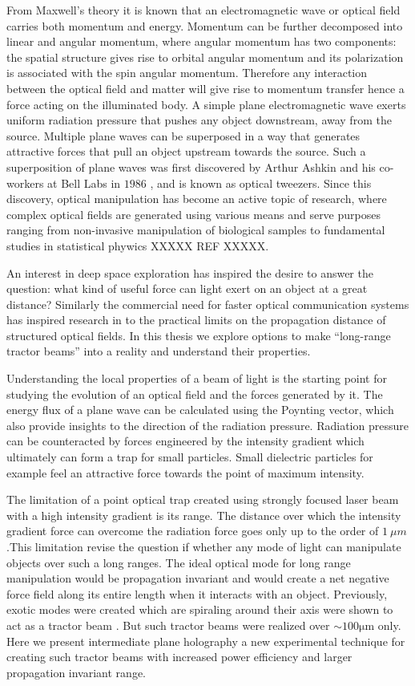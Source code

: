 From Maxwell's theory it is known that an electromagnetic wave or optical field carries both momentum and energy. Momentum can be further decomposed into linear and angular momentum, where angular momentum has two components: the spatial structure gives rise to orbital angular momentum \cite{Yao2011} and its polarization is associated with the spin angular momentum. Therefore any interaction between the optical field and matter will give rise to momentum transfer hence a force acting on the illuminated body. A simple plane electromagnetic wave exerts uniform radiation pressure that pushes any object downstream, away from the source. Multiple plane waves can be superposed in a way that generates attractive forces that pull an object upstream towards the source. Such a superposition of plane waves was first discovered by Arthur Ashkin and his co-workers at Bell Labs in $1986$ \cite{beth1936}, and is known as optical tweezers. Since this discovery, optical manipulation has become an active topic of research, where complex optical fields are generated using various means and serve purposes ranging from non-invasive manipulation of biological samples to fundamental studies in statistical phywics XXXXX REF XXXXX.


An interest in deep space exploration has inspired the desire to answer the question: what kind of useful force can light exert on an object at a great distance? Similarly the commercial need for faster optical communication systems has inspired research in to the practical limits on the propagation distance of structured optical fields. In this thesis we explore options to make ``long-range tractor beams'' into a reality and understand their properties.


Understanding the local properties of a beam of light is the starting point for studying the evolution of an optical field and the forces generated by it. The energy flux of a plane wave can be calculated using the Poynting vector, which also provide insights to the direction of the radiation pressure. Radiation pressure can be counteracted by forces engineered by the intensity gradient which ultimately can form a trap for small particles. Small dielectric particles for example feel an attractive force towards the point of maximum intensity.


The limitation of a point optical trap created using strongly focused laser beam with a high intensity gradient is its range. The distance over which the intensity gradient force can overcome the radiation force goes only up to the order of $\SI{1}{\mu m}$.This limitation revise the question if whether any mode of light  can manipulate objects over such a long ranges. The ideal optical mode for long range manipulation would be propagation invariant  and would create a net negative force field along its entire length when it interacts with an object. Previously, exotic modes were created which are spiraling around their axis were shown to act as a tractor beam \cite{Lee_2010}. But such tractor beams were realized over $\sim 100 \mathrm{\mu m}$ only. Here we present intermediate plane holography a new experimental technique for creating such tractor beams with increased power efficiency and larger propagation invariant range.


